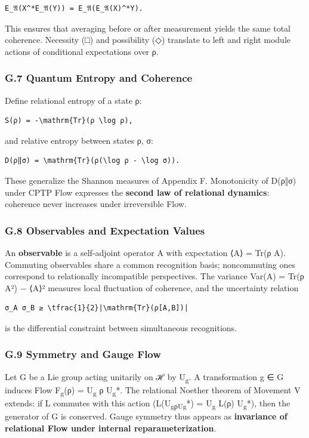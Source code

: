\documentclass[11pt]{article}
\begin{document}
\begin{verbatim}
E_𝔄(X^*E_𝔄(Y)) = E_𝔄(E_𝔄(X)^*Y).
\end{verbatim}

This ensures that averaging before or after measurement yields the same total coherence.  
Necessity (□) and possibility (◇) translate to left and right module actions  
of conditional expectations over ρ.
\subsubsection*{G.7 Quantum Entropy and Coherence}
\label{sec:org74ea54f}
Define relational entropy of a state ρ:

\begin{verbatim}
S(ρ) = -\mathrm{Tr}(ρ \log ρ),
\end{verbatim}

and relative entropy between states ρ, σ:

\begin{verbatim}
D(ρ‖σ) = \mathrm{Tr}(ρ(\log ρ - \log σ)).
\end{verbatim}

These generalize the Shannon measures of Appendix F.  
Monotonicity of D(ρ‖σ) under CPTP Flow expresses  
the \textbf{second law of relational dynamics}: coherence never increases under irreversible Flow.
\subsubsection*{G.8 Observables and Expectation Values}
\label{sec:org2d7f0b5}
An \textbf{observable} is a self-adjoint operator A with expectation  
⟨A⟩ = Tr(ρ A).  
Commuting observables share a common recognition basis;  
noncommuting ones correspond to relationally incompatible perspectives.  
The variance Var(A) = Tr(ρ A²) − ⟨A⟩²  
measures local fluctuation of coherence,  
and the uncertainty relation  

\begin{verbatim}
σ_A σ_B ≥ \tfrac{1}{2}|\mathrm{Tr}(ρ[A,B])|
\end{verbatim}

is the differential constraint between simultaneous recognitions.
\subsubsection*{G.9 Symmetry and Gauge Flow}
\label{sec:orge6d9cf9}
Let G be a Lie group acting unitarily on ℋ by U\textsubscript{g}.  
A transformation g ∈ G induces Flow F\textsubscript{g}(ρ) = U\textsubscript{g} ρ U\textsubscript{g}*.  
The relational Noether theorem of Movement V extends:  
if L commutes with this action (L(U\textsubscript{gρU}\textsubscript{g}*) = U\textsubscript{g} L(ρ) U\textsubscript{g}*),  
then the generator of G is conserved.  
Gauge symmetry thus appears as \textbf{invariance of relational Flow under internal reparameterization}.
\end{document}

